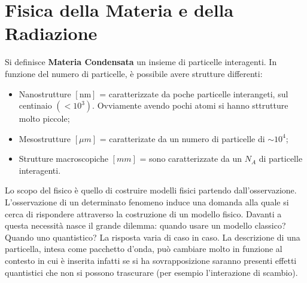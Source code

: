 \documentclass[a4paper,12pt]{article}
\begin{document}
\section{Fisica della Materia e della Radiazione}
Si definisce \textbf{Materia Condensata} un insieme di particelle interagenti. In funzione del numero di particelle, è possibile avere strutture differenti:
\begin{itemize}
	\item Nanostrutture $[\text{nm}]$ = caratterizzate da poche particelle interangeti, sul centinaio $(<10^3)$. Ovviamente avendo pochi atomi si hanno sttrutture molto piccole;
	\item Mesostrutture $[\mu m]$ = caratterizate da un numero di particelle di $\sim  10^4$;
	\item Strutture macroscopiche $[mm]$ = sono caratterizzate da un $N_A$ di particelle interagenti.
\end{itemize}
Lo scopo del fisico è quello di costruire modelli fisici partendo dall'osservazione. L'osservazione di un determinato fenomeno induce una domanda alla quale si cerca di rispondere attraverso la costruzione di un modello fisico. Davanti a questa necessità nasce il grande dilemma: quando usare un modello classico? Quando uno quantistico? La risposta varia di caso in caso. La descrizione di una particella, intesa come pacchetto d'onda, può cambiare molto in funzione al contesto in cui è inserita infatti se si ha sovrapposizione saranno presenti effetti quantistici che non si possono trascurare (per esempio l'interazione di scambio).
\end{document}
